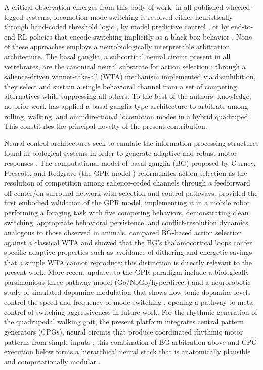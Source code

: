 \documentclass[preprint,12pt]{elsarticle}
\begin{document}
A critical observation emerges from this body of work: in all published wheeled-legged systems, locomotion mode switching is resolved either heuristically through hand-coded threshold logic \citep{Bjelonic2019KeepRollin,Kashiri2019CENTAURO}, by model predictive control \citep{bjelonic2019,Bjelonic2022OfflineMotion}, or by end-to-end RL policies that encode switching implicitly as a black-box behavior \citep{Lee2024Science,Humphreys2025BioInspired}. None of these approaches employs a neurobiologically interpretable arbitration architecture. The basal ganglia, a subcortical neural circuit present in all vertebrates, are the canonical neural substrate for action selection \citep{Gurney2001a,Gurney2001b}: through a salience-driven winner-take-all (WTA) mechanism implemented via disinhibition, they select and sustain a single behavioral channel from a set of competing alternatives while suppressing all others. To the best of the authors' knowledge, no prior work has applied a basal-ganglia-type architecture to arbitrate among rolling, walking, and omnidirectional locomotion modes in a hybrid quadruped. This constitutes the principal novelty of the present contribution.

Neural control architectures seek to emulate the information-processing structures found in biological systems in order to generate adaptive and robust motor responses \citep{mead1990neuromorphic,ijspeert2008}. The computational model of basal ganglia (BG) proposed by Gurney, Prescott, and Redgrave (the GPR model \citep{Gurney2001a,Gurney2001b}) reformulates action selection as the resolution of competition among salience-coded channels through a feedforward off-center/on-surround network with selection and control pathways. \citet{Prescott2006Robot} provided the first embodied validation of the GPR model, implementing it in a mobile robot performing a foraging task with five competing behaviors, demonstrating clean switching, appropriate behavioral persistence, and conflict-resolution dynamics analogous to those observed in animals. \citet{Girard2003Basal} compared BG-based action selection against a classical WTA and showed that the BG's thalamocortical loops confer specific adaptive properties such as avoidance of dithering and energetic savings that a simple WTA cannot reproduce; this distinction is directly relevant to the present work. More recent updates to the GPR paradigm include a biologically parsimonious three-pathway model (Go/NoGo/hyperdirect) \citep{Baston2015Biologically} and a neurorobotic study of simulated dopamine modulation that shows how tonic dopamine levels control the speed and frequency of mode switching \citep{Prescott2024Simulated}, opening a pathway to meta-control of switching aggressiveness in future work. For the rhythmic generation of the quadrupedal walking gait, the present platform integrates central pattern generators (CPGs), neural circuits that produce coordinated rhythmic motor patterns from simple inputs \citep{ijspeert2008}; this combination of BG arbitration above and CPG execution below forms a hierarchical neural stack that is anatomically plausible and computationally modular \citep{Bellegarda2022CPGRL,Manoonpong2013Neural}.
\end{document}
